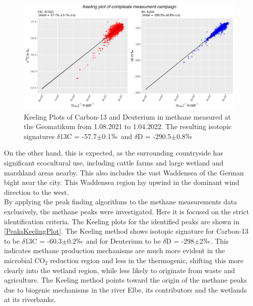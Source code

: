 \begin{figure}[htbp]
 \centering
 \includegraphics[width=1\textwidth]{figures/Appendix/Keeling/11_Keeling_Plot_Total_medium_peaks.png}
 \caption[Keeling Plot for total CR-IRMS measument]{Keeling Plots of Carbon-13 and Deuterium in methane measured at the Geomatikum from 1.08.2021 to 1.04.2022. The resulting isotopic signatures $\delta$13C = -57.7$\pm $0.1$\permil$ and $\delta$D = -290.5$\pm $0.8$\permil$}
 \label{TolalKeelingPlot}
\end{figure}
On the other hand, this is expected, as the surrounding countryside has significant ecocultural use, including cattle farms and large wetland and marshland areas nearby. This also includes the vast Waddensea of the German bight near the city. This Waddensea region lay upwind in the dominant wind direction to the west.\\
By applying the peak finding algorithms to the methane measurements data exclusively, the methane peaks were investigated. Here it is focused on the strict identification criteria. The Keeling plots for the identified peaks are shown in \cref{PeaksKeelingPlot}. The Keeling method shows isotopic signature for  Carbon-13  to be $\delta$13C = -60.3$\pm $0.2$\permil$ and for Deuterium to be $\delta$D = -298$\pm $2$\permil$. This indicates methane production mechanisms are much more evident in the microbial CO$_2$ reduction region and less in the thermogenic, shifting this more clearly into the wetland region, while less likely to originate from waste and agriculture. The Keeling method points toward the origin of the methane peaks due to biogenic mechanisms in the river Elbe, its contributors and the wetlands at its riverbanks.
